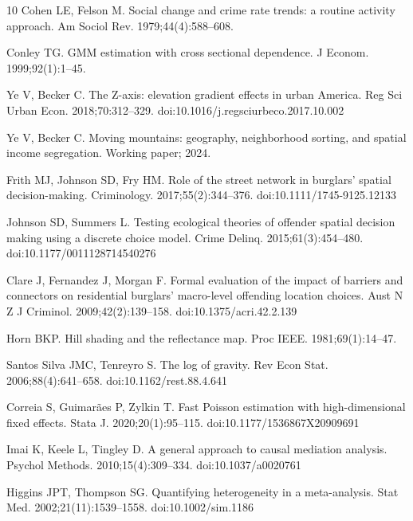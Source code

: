 \documentclass[10pt,letterpaper]{article}
\begin{document}
\begin{thebibliography}{10}
Cohen LE, Felson M.
\newblock Social change and crime rate trends: a routine activity approach.
\newblock Am Sociol Rev. 1979;44(4):588--608.

Conley TG.
\newblock GMM estimation with cross sectional dependence.
\newblock J Econom. 1999;92(1):1--45.

Ye V, Becker C.
\newblock The Z-axis: elevation gradient effects in urban America.
\newblock Reg Sci Urban Econ. 2018;70:312--329.
\newblock doi:10.1016/j.regsciurbeco.2017.10.002

Ye V, Becker C.
\newblock Moving mountains: geography, neighborhood sorting, and spatial income
segregation.
\newblock Working paper; 2024.

Frith MJ, Johnson SD, Fry HM.
\newblock Role of the street network in burglars' spatial decision-making.
\newblock Criminology. 2017;55(2):344--376.
\newblock doi:10.1111/1745-9125.12133

Johnson SD, Summers L.
\newblock Testing ecological theories of offender spatial decision making using a
discrete choice model.
\newblock Crime Delinq. 2015;61(3):454--480.
\newblock doi:10.1177/0011128714540276

Clare J, Fernandez J, Morgan F.
\newblock Formal evaluation of the impact of barriers and connectors on residential
burglars' macro-level offending location choices.
\newblock Aust N Z J Criminol. 2009;42(2):139--158.
\newblock doi:10.1375/acri.42.2.139

Horn BKP.
\newblock Hill shading and the reflectance map.
\newblock Proc IEEE. 1981;69(1):14--47.

Santos Silva JMC, Tenreyro S.
\newblock The log of gravity.
\newblock Rev Econ Stat. 2006;88(4):641--658.
\newblock doi:10.1162/rest.88.4.641

Correia S, Guimar\~aes P, Zylkin T.
\newblock Fast Poisson estimation with high-dimensional fixed effects.
\newblock Stata J. 2020;20(1):95--115.
\newblock doi:10.1177/1536867X20909691

Imai K, Keele L, Tingley D.
\newblock A general approach to causal mediation analysis.
\newblock Psychol Methods. 2010;15(4):309--334.
\newblock doi:10.1037/a0020761

Higgins JPT, Thompson SG.
\newblock Quantifying heterogeneity in a meta-analysis.
\newblock Stat Med. 2002;21(11):1539--1558.
\newblock doi:10.1002/sim.1186


\end{thebibliography}
\end{document}

